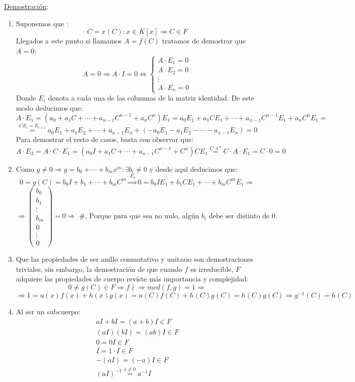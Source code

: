 \documentclass[10pt,a4paper,openright]{book}
\theoremstyle{break}
\begin{document}
\underline{Demostración}:
\begin{enumerate}
\item Suponemos que :
$$C=x(C): x\in K[x]\Rightarrow C\in F$$
Llegados a este punto si llamamos $A=f(C)$ tratamos de demostrar que $A=0$:
$$A=0\Rightarrow A\cdot I=0\Leftrightarrow \begin{cases}
A\cdot E_1=0 \\
A\cdot E_2=0 \\
\vdots \\
A\cdot E_n=0
\end{cases}$$
Donde $E_i$ denota a cada una de las columnas de la matriz identidad. De este modo deducimos que:
$$A\cdot E_1=(a_0+a_1C+\cdots +a_{n-1}C^{n-1}+a_nC^n)E_1=a_0E_1+a_1CE_1+\cdots +a_{n-1}C^{n-1}E_1+a_nC^nE_1=$$
$$\stackrel{CE_i=E_{i+1}}=a_0E_1+a_1E_2+\cdots +a_{n-1}E_n+(-a_0E_1-a_1E_2-\cdots -a_{n-1}E_n)=0$$
Para demostrar el resto de casos, basta con observar que:
$$A\cdot E_2=A\cdot C\cdot E_1=(a_0I+a_1C+\cdots+ a_{n-1}C^{n-1}+C^n)CE_1\stackrel{C\cdot C^{i}}{=}C\cdot A\cdot E_1=C\cdot 0=0$$

\item Como $g\neq 0\Rightarrow g=b_0+\cdots+b_mx^m: \exists b_i\neq 0$ y desde aquí deducimos que:
$$0=g(C)=b_0I+b_1+\cdots +b_mC^m\stackrel{\cdot E_1}{\Rightarrow} 0=b_0IE_1+b_1CE_1+\cdots+b_mC^mE_1\Rightarrow$$
$$\Rightarrow \left(\begin{array}{c}
b_0 \\
b_1 \\
\vdots \\
b_m \\
0 \\
\vdots \\
0
\end{array}\right)=0\Rightarrow \mbox{ \#, Porque para que sea no nulo, algún $b_i$ debe ser distinto de 0.}
$$

\item Que las propiedades de ser anillo conmutativo y unitario son demostraciones triviales, sin embargo, la demostración de que cuando $f$ es irreducible, $F$ adquiere las propiedades de cuerpo reviste más importancia y complejidad:
$$0\neq g(C)\in F\Rightarrow f\nmid\Rightarrow mcd(f,g)=1\Rightarrow$$
$$\Rightarrow 1=u(x)f(x)+h(x)g(x)=u(C)f(C)+h(C)g(C)=h(C)g(C)\Rightarrow g^{-1}(C)=h(C)$$

\item Al ser un subcuerpo:
\begin{gather*}
aI+bI=(a+b)I\in F \\
(aI)(bI)=(ab)I\in F \\
0=0I\in F \\
I=1\cdot I\in F \\
-(aI)=(-a)I\in F \\
(aI)^{-1}\stackrel{a\neq 0}{=}a^{-1}I \\
\end{gather*}


\end{enumerate}
\end{document}
